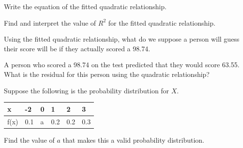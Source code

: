 \documentclass[addpoints]{examsetup}
\begin{document}
\begin{questions}
\begin{parts}
   \begin{subparts}
      \subpart[5] Write the equation of the fitted quadratic relationship.
      
\hfill {}

      \vspace{1cm}
      \subpart[5] Find and interpret the value of $R^2$ for the fitted quadratic relationship.
                        \hfill {}

      \vspace{5cm}
\pagebreak      
      \subpart[5] Using the fitted quadratic relationship, what do we suppose a person will guess their score will be if they actually scored a 98.74.
      
                  \hfill {}

      \vspace{2cm}
     
      \subpart[2] A person who scored a 98.74 on the test predicted that they would score 63.55. What is the residual for this person using the quadratic relationship?
      
\hfill {}

      \vspace{2cm}
   \end{subparts}
\end{parts}

\question
Suppose the following is the probability distribution for $X$. 
 \begin{table}[h!]
     \centering
     \begin{tabular}{llllll}
        \hline
         x  & -2  & 0 &  1  & 2 & 3     \\\hline \hline
         f(x) & 0.1 &  a & 0.2  & 0.2 &  0.3  \\\hline \hline

     \end{tabular}
  \end{table}
         \begin{subparts}
               \subpart[3] Find the value of $a$ that makes this a valid probability distribution.
                                       \hfill {}
         

\end{subparts}
\end{questions}
\end{document}
